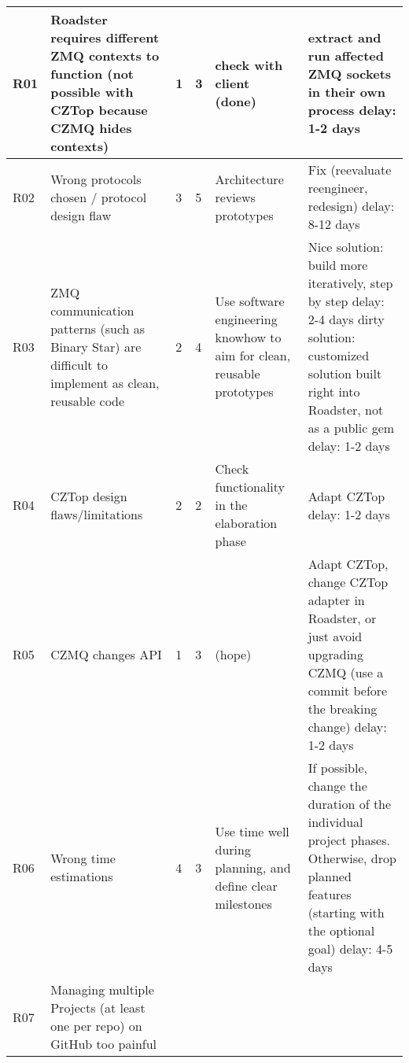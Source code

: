 \begin{center}
\begin{longtable}{|p{6mm}|p{30mm}|p{6mm}|p{8mm}|p{30mm}|p{64mm}|}
    \hline
    \endlastfoot
    R01
		& Roadster requires different ZMQ contexts to function (not possible with CZTop because CZMQ hides contexts)
		& \cellcolor{green!50}1
		& \cellcolor{green!50}3
		& check with client	(done)
		& extract and run affected ZMQ \newline sockets in their own process \newline delay: 1-2 days \\ \hline
	R02
		& Wrong protocols chosen / protocol design flaw
		& \cellcolor{orange!50}3
		& \cellcolor{orange!50}5
		& Architecture \newline reviews prototypes
		& Fix (reevaluate reengineer, redesign) \newline delay: 8-12 days	\\ \hline
	R03
		& ZMQ communication patterns (such as Binary Star) are difficult to implement as clean, reusable code
		& \cellcolor{yellow!50}2
		& \cellcolor{yellow!50}4
		& Use software engineering knowhow to aim for clean, reusable prototypes
		& Nice solution: \newline build more iteratively, step by step \newline delay: 2-4 days \newline \newline dirty solution:
		\newline customized solution built right into Roadster, not as a public gem \newline delay: 1-2 days \\ \hline
	R04
		& CZTop design flaws/limitations
		& \cellcolor{green!50}2
		& \cellcolor{green!50}2
		& Check functionality in the elaboration phase
		& Adapt CZTop \newline delay: 1-2 days \\ \hline
	R05
		& CZMQ changes API
		& \cellcolor{green!50}1
		& \cellcolor{green!50}3
		& (hope)
		& Adapt CZTop, change CZTop adapter in Roadster, or just avoid upgrading CZMQ (use a commit before the breaking change) \newline delay: 1-2 days \\ \hline
	R06
		& Wrong time estimations
		& \cellcolor{yellow!50}4
		& \cellcolor{yellow!50}3
		& Use time well during planning, and define clear milestones
		& If possible, change the duration of the individual project phases. Otherwise, drop planned features
		(starting with the optional goal) \newline delay: 4-5 days \\ \hline
	R07
		& Managing multiple Projects (at least one per repo) on GitHub too painful

\end{longtable}
\end{center}
